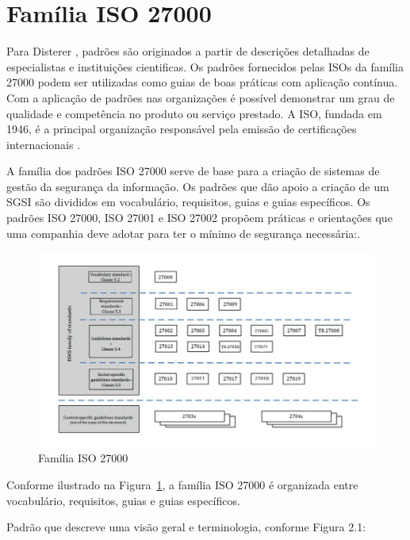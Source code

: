 \section{\label{sec:secao1}Família ISO 27000}




Para Disterer \cite{disterer2013}, padrões são originados a partir de descrições detalhadas de especialistas e instituições cientificas. Os padrões fornecidos pelas ISOs da família 27000 podem ser utilizadas como guias de boas práticas com aplicação contínua. Com a aplicação de padrões nas organizações é possível demonstrar um grau de qualidade e competência no produto ou serviço prestado. A ISO, fundada em 1946, é a principal organização responsável pela emissão de certificações internacionais \cite{disterer2013}. 




A família dos padrões ISO 27000 serve de base para a criação de sistemas de gestão da segurança da informação. Os padrões que dão apoio a criação de um SGSI  são divididos em vocabulário, requisitos, guias e guias específicos. Os padrões ISO 27000, ISO 27001 e ISO 27002 propõem práticas e orientações que uma companhia deve adotar para ter o mínimo de segurança necessária:\cite{disterer2013, ISOPDF}.


\begin{figure}
    \centering
    \includegraphics[scale=0.55]{fig/ISO27000.JPG}
    \caption{Família ISO 27000}
    \label{fig:testeISO}
\end{figure}


Conforme ilustrado na Figura~\ref{fig:testeISO}, a família ISO 27000 é organizada entre vocabulário, requisitos, guias e guias específicos.  


\item{Padrão que descreve uma visão geral e terminologia, conforme Figura 2.1:}

